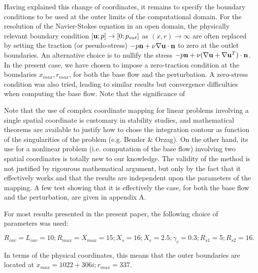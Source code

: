 \documentclass{jfm}
\begin{document}
Having explained this change of coordinates, it remains to specify the boundary conditions to be used at the outer limits of the computational domain. For the resolution of the Navier-Stokes equation in an open domain, the physically relevant boundary condition $[{\bf u}; p] \rightarrow [0; p_{out}]$ as $(x,r) \rightarrow \infty$   
are often replaced by setting the traction (or pseudo-stress) $-p {\bf n} + \nu \nabla {\bf u} \cdot {\bf n} $ to zero
at the outlet boundaries. An alternative choice is to nullify the stress $-p {\bf n} + \nu ( \nabla {\bf u} + \nabla {\bf u}^T) \cdot {\bf n} $. In the present case, we have chosen to impose a zero-traction condition at the boundaries $x_{max},r_{max}$, for both the base flow and the perturbation. A zero-stress condition was also tried, leading to similar results but convergence difficulties when computing the base flow. Note that the significance of 

Note that the use of complex coordinate mapping for linear problems involving a single spatial coordinate is customary in stability studies, and mathematical theorems are available to justify how to chose the integration contour as function of the singularities of the problem (e.g. Bender \& Orzag). On the other hand, its use for a nonlinear problem (i.e. computation of the base flow) involving two spatial coordinates is totally new to our knowledge. The validity of the method is not justified by rigourous mathematical argument, but only by the fact that it effectively works and that the results are independent upon the parameters of the mapping. A few test showing that it is effectively the case, for both the base flow and the perturbation, are given in appendix A.

For most results presented in the present paper, the following choice of parameters was used: 

$$
R_{cav}=L_{cav}=10 ; R_{max} = X_{max} = 15; X_s = 16 ; X_c = 2.5 ; \gamma_c = 0.3 ; R_{s1} = 5;
R_{s2} = 16.
$$

In terms of the physical coordinates, this means that the outer boundaries are located at
$x_{max} = 1022+306i ; r_{max} = 337$.
 




\end{document}

